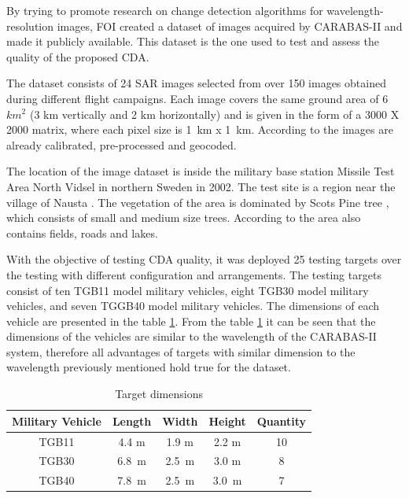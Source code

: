 By trying to promote research on change detection algorithms for wavelength-resolution
images, FOI created a dataset of images acquired by CARABAS-II and made it publicly available. 
This dataset is the one used to test and assess the quality of the proposed CDA.

The dataset consists of 24 SAR images selected from over 150 images obtained during different flight campaigns.
Each image covers the same ground area of 6 $km^2$ (3 km vertically and 2 km horizontally)
and is given in the form of a 3000 X 2000 matrix, where each pixel size is 1 km x 1 km.
According to \cite{ 77,62,78} the images are already calibrated, pre-processed and geocoded.

The location of the image dataset is inside the military base station Missile Test Area North
Vidsel in northern Sweden in 2002. The test site is a region near the village of Nausta \cite{75}.
The vegetation of the area is dominated by Scots Pine tree \cite{ 76}, which consists of small and medium size trees.
According to \cite{75} the area also contains fields, roads and lakes.

With the objective of testing CDA quality, it was deployed 25 testing targets over the testing with different configuration 
and arrangements. The testing targets consist of ten TGB11 model military vehicles, eight TGB30 model 
military vehicles, and seven TGGB40 model military vehicles. The dimensions of each vehicle are presented in the table \ref{tab:vehicle_dimensions}.
From the table \ref{tab:vehicle_dimensions} it can be seen that the dimensions of the vehicles are similar to the wavelength of the CARABAS-II system,
therefore all advantages of targets with similar dimension to the wavelength previously mentioned hold true for the dataset.

\begin{table}[H]
    \centering
    \begin{tabular}{|c|c|c|c|c|}
        \hline 
        Military Vehicle & Length & Width & Height & Quantity \\ \hline \hline
        TGB11 & 4.4 m & 1.9 m & 2.2 m & 10 \\ \hline
        TGB30 & 6.8 m & 2.5 m & 3.0 m & 8 \\ \hline
        TGB40 & 7.8 m & 2.5 m & 3.0 m & 7 \\ \hline
    \end{tabular}
    \caption{Target dimensions}
    \label{tab:vehicle_dimensions}
\end{table}



